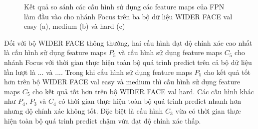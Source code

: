 {    \begin{figure}[H]
        \centering
        \caption{Kết quả so sánh các cấu hình sử dụng các feature maps của FPN làm đầu vào cho nhánh Focus trên ba bộ dữ liệu WIDER FACE val easy (a), medium (b) và hard (c)}
        \label{fig:retinafocus_widerface_val_fpn}
    \end{figure}

    \noindent
    Đối với bộ WIDER FACE thông thường, hai cấu hình đạt độ chính xác cao nhất là cấu hình sử dụng feature maps ${P}_{5}$ và cấu hình sử dụng feature maps ${C}_{5}$ cho nhánh Focus với thời gian thực hiện toàn bộ quá trình predict trên cả bộ dữ liệu lần lượt là ... và ....
    Trong khi cấu hình sử dụng feature maps ${P}_{5}$ cho kết quả tốt hơn trên bộ WIDER FACE val easy và medium thì cấu hình sử dụng feature maps ${C}_{5}$ cho kết quả tốt hơn trên bộ WIDER FACE val hard.
    Các cấu hình khác như ${P}_{4}$, ${P}_{3}$ và ${C}_{4}$ có thời gian thực hiện toàn bộ quá trình predict nhanh hơn nhưng độ chính xác không tốt.
    Đặc biệt là cấu hình ${C}_{3}$ vừa có thời gian thực hiện toàn bộ quá trình predict chậm vừa đạt độ chính xác thấp.

}
